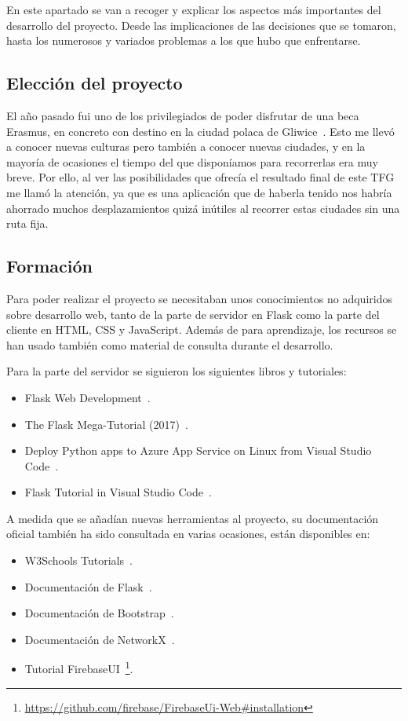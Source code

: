 
En este apartado se van a recoger y explicar los aspectos más importantes del desarrollo del proyecto. Desde las implicaciones de las decisiones que se tomaron, hasta los numerosos y variados problemas a los que hubo que enfrentarse.

\subsection{Elección del proyecto}

El año pasado fui uno de los privilegiados de poder disfrutar de una beca Erasmus, en concreto con destino en la ciudad polaca de Gliwice~\cite{wiki:gliwice}.
Esto me llevó a conocer nuevas culturas pero también a conocer nuevas ciudades, y en la mayoría de ocasiones el tiempo del que disponíamos para recorrerlas era muy breve. Por ello, al ver las posibilidades que ofrecía el resultado final de este TFG me llamó la atención, ya que es una aplicación que de haberla tenido nos habría ahorrado muchos desplazamientos quizá inútiles al recorrer estas ciudades sin una ruta fija.

\subsection{Formación}

Para poder realizar el proyecto se necesitaban unos conocimientos no adquiridos sobre desarrollo web, tanto de la parte de servidor en Flask como la parte del cliente en HTML, CSS y JavaScript. Además de para aprendizaje, los recursos se han usado también como material de consulta durante el desarrollo.

Para la parte del servidor se siguieron los siguientes libros y tutoriales:
\begin{itemize}
	\item Flask Web Development~\cite{grinberg2014flask}.
	\item The Flask Mega-Tutorial (2017)~\cite{grinberg-mega}.
	\item Deploy Python apps to Azure App Service on Linux from Visual Studio Code~\cite{deploy-flask-azure}.
	\item Flask Tutorial in Visual Studio Code~\cite{vscode-flask}.
\end{itemize}


A medida que se añadían nuevas herramientas al proyecto, su documentación
oficial también ha sido consultada en varias ocasiones, están disponibles en:
\begin{itemize}
	\item W3Schools Tutorials~\cite{w3schools}.
	\item Documentación de Flask~\cite{doc:flask}.
	\item Documentación de Bootstrap~\cite{doc:bootstrap}.
	\item Documentación de NetworkX~\cite{SciPyProceedings_11}.
	\item Tutorial FirebaseUI~\footnote{\url{https://github.com/firebase/FirebaseUi-Web\#installation}}.
\end{itemize}


